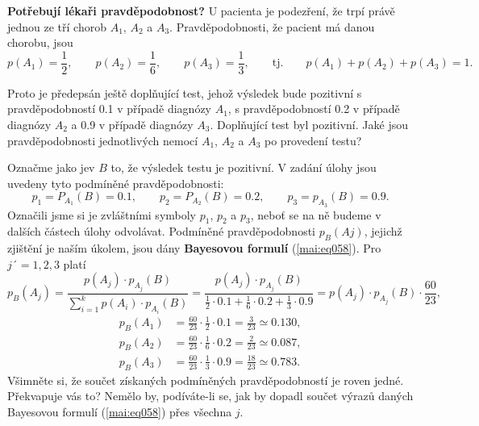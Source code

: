 \wikitextrule
\begin{example}\label{mai:exam061}
  \textbf{Potřebují lékaři pravděpodobnost?}\newline\small
  U pacienta je podezření, že trpí právě jednou ze tří chorob \(A_1\), \(A_2\) a \(A_3\). 
  Pravděpodobnosti, že pacient má danou chorobu, jsou
  \begin{equation*}
    p(A_1) = \frac{1}{2},\qquad p(A_2) = \frac{1}{6},\qquad p(A_3) = \frac{1}{3}, \qquad
    \text{tj.}\qquad p(A_1) + p(A_2) + p(A_3) = 1.
  \end{equation*}
  
  Proto je předepsán ještě doplňující test, jehož výsledek bude pozitivní s pravděpodobností 
  \num{0.1} v případě diagnózy \(A_1\), s pravděpodobností \num{0.2} v případě diagnózy \(A_2\) a 
  \num{0.9} v případě diagnózy \(A_3\). Doplňující test byl pozitivní. Jaké jsou pravděpodobnosti 
  jednotlivých nemocí \(A_1\), \(A_2\) a \(A_3\) po provedení testu?

  Označme jako jev \(B\) to, že výsledek testu je pozitivní. V zadání úlohy jsou uvedeny tyto 
  podmíněné pravděpodobnosti:
  \begin{equation*}
    p_1 = P_{A_1}(B) = \num{0.1}, \qquad p_2 = P_{A_2}(B) = \num{0.2}, \qquad 
    p_3 = p_{A_3}(B) = \num{0.9}.
  \end{equation*}
  Označili jsme si je zvláštními symboly \(p_1\), \(p_2\) a \(p_3\), neboť se na ně budeme v 
  dalších částech úlohy odvolávat. Podmíněné pravděpodobnosti \(p_B(Aj)\), jejichž zjištění je 
  naším úkolem, jsou dány \textbf{Bayesovou formulí} (\ref{mai:eq058}). Pro \(j´= 1, 2, 3\) platí
  \begin{equation*}
    p_B(A_j) = \dfrac{p(A_j)\cdot p_{A_j}(B)}{\sum_{i=1}^{k}p(A_i)\cdot p_{A_i}(B)}  
             = \dfrac{p(A_j)\cdot p_{A_j}(B)}{\frac{1}{2}\cdot\num{0.1} + 
                                              \frac{1}{6}\cdot\num{0.2} + 
                                              \frac{1}{3}\cdot\num{0.9}}
             = p(A_j)\cdot p_{A_j}(B)\cdot\frac{60}{23},
  \end{equation*}
  \begin{align*}
    p_B(A_1) &= \frac{60}{23} \cdot\frac{1}{2}\cdot\num{0.1} =\frac{3}{23}\simeq\num{0.130},     \\
    p_B(A_2) &= \frac{60}{23} \cdot\frac{1}{6}\cdot\num{0.2} =\frac{2}{23}\simeq\num{0.087},     \\
    p_B(A_3) &= \frac{60}{23} \cdot\frac{1}{3}\cdot\num{0.9} =\frac{18}{23}\simeq\num{0.783}.
  \end{align*}
  Všimněte si, že součet získaných podmíněných pravděpodobností je roven jedné. Překvapuje vás to? 
  Nemělo by, podíváte-li se, jak by dopadl součet výrazů daných Bayesovou formulí (\ref{mai:eq058}) 
  přes všechna \(j\).
  

\end{example}
